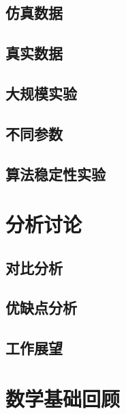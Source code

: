 \documentclass[UTF8,12pt]{ctexart}
\begin{document}
\subsection{仿真数据}

\subsection{真实数据}

\subsection{大规模实验}

\subsection{不同参数}

\subsection{算法稳定性实验}

\newpage
\section{分析讨论}

\subsection{对比分析}

\subsection{优缺点分析}

\subsection{工作展望}



\newpage
\appendix
\section{数学基础回顾}
\end{document}
